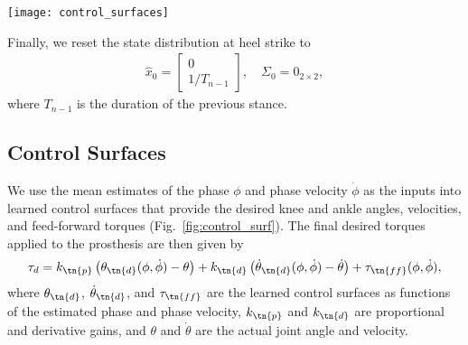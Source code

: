 \begin{figure*}[t]
    \centering
    \texttt{[image: control\_surfaces]}
    \caption{Examples of learned control surfaces. We fit the surfaces to gait
    data from \citet{moore2015elaborate}. This data includes information for
    three speeds, , which are shown as the
    clustered trajectories in the above panels.  For an automatic transition to
    standing, the surfaces are additionally fit to virtual data that causes the
    joint angles to approach \unit[5]{deg}, the velocities to approach
    , and the joint torques to approach \unit[0]{N-m} as the
    phase velocity goes to zero.}\label{fig:control_surf}
\end{figure*}

Finally, we reset the state distribution at heel strike to
\begin{align}
    \hat{x}_0 = \begin{bmatrix} 0 \\ 1/T_{n-1} \end{bmatrix}, \quad \Sigma_0 
        =  0_{2 \times 2}, \label{eq:init_cond_ekf}
\end{align}
where $T_{n-1}$ is the duration of the previous stance.

\subsection{Control Surfaces}\label{sec:ctrl_surfs}

We use the mean estimates of the phase $\phi$ and phase velocity $\dot{\phi}$ as
the inputs into learned control surfaces that provide the desired knee and ankle
angles, velocities, and feed-forward torques (Fig.~\ref{fig:control_surf}). The
final desired torques applied to the prosthesis are then given by 
\begin{align}
    \tau_d = k_\tn{p} \left(\theta_\tn{d}(\phi, \dot{\phi}) - \theta \right) 
        + k_\tn{d} \left(\dot{\theta}_\tn{d}(\phi, \dot{\phi}) 
            - \dot{\theta} \right)
        + \tau_\tn{ff}(\phi, \dot{\phi}), \label{eq:pdandff}
\end{align}
where $\theta_\tn{d}$, $\dot{\theta}_\tn{d}$, and $\tau_\tn{ff}$ are the
learned control surfaces as functions of the estimated phase and phase velocity,
$k_\tn{p}$ and $k_\tn{d}$ are proportional and derivative gains,
and $\theta$ and $\dot{\theta}$ are the actual joint angle and velocity.

